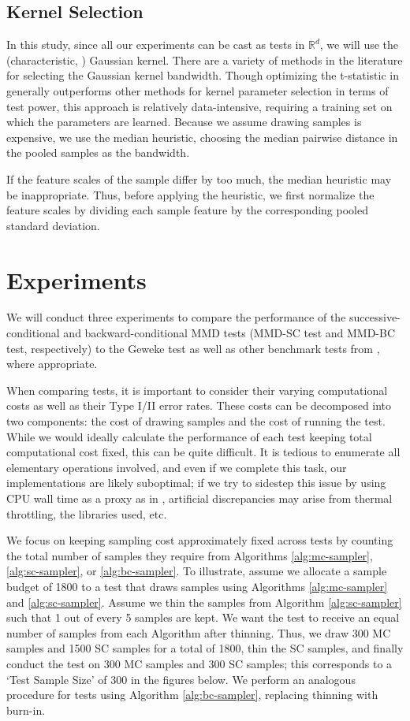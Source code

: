 \documentclass[a4paper,11pt]{article}
\begin{document}
\subsection{Kernel Selection}
In this study, since all our experiments can be cast as tests in $\mathbb{R}^{d}$, we will use the (characteristic, \cite{fukumizu_kernel_2007}) Gaussian kernel. There are a variety of methods in the literature for selecting the Gaussian kernel bandwidth. Though optimizing the t-statistic in \cite{sutherland_generative_2019} generally outperforms other methods for kernel parameter selection in terms of test power, this approach is relatively data-intensive, requiring a training set on which the parameters are learned. Because we assume drawing samples is expensive, we use the median heuristic, choosing the median pairwise distance in the pooled samples as the bandwidth.

If the feature scales of the sample differ by too much, the median heuristic may be inappropriate. Thus, before applying the heuristic, we first normalize the feature scales by dividing each sample feature by the corresponding pooled standard deviation.

\section{Experiments}
We will conduct three experiments to compare the performance of the successive-conditional and backward-conditional MMD tests (MMD-SC test and MMD-BC test, respectively) to the Geweke test as well as other benchmark tests from \cite{gandy_unit_2020}, where appropriate.

When comparing tests, it is important to consider their varying computational costs as well as their Type I/II error rates. These costs can be decomposed into two components: the cost of drawing samples and the cost of running the test. While we would ideally calculate the performance of each test keeping total computational cost fixed, this can be quite difficult. It is tedious to enumerate all elementary operations involved, and even if we complete this task, our implementations are likely suboptimal; if we try to sidestep this issue by using CPU wall time as a proxy as in \cite{gandy_unit_2020}, artificial discrepancies may arise from thermal throttling, the libraries used, etc. 

We focus on keeping sampling cost approximately fixed across tests by counting the total number of samples they require from Algorithms \ref{alg:mc-sampler}, \ref{alg:sc-sampler}, or \ref{alg:bc-sampler}. To illustrate, assume we allocate a sample budget of 1800 to a test that draws samples using Algorithms \ref{alg:mc-sampler} and \ref{alg:sc-sampler}. Assume we thin the samples from Algorithm \ref{alg:sc-sampler} such that 1 out of every 5 samples are kept. We want the test to receive an equal number of samples from each Algorithm after thinning. Thus, we draw 300 MC samples and 1500 SC samples for a total of 1800, thin the SC samples, and finally conduct the test on 300 MC samples and 300 SC samples; this corresponds to a `Test Sample Size' of 300 in the figures below. We perform an analogous procedure for tests using Algorithm \ref{alg:bc-sampler}, replacing thinning with burn-in.
\end{document}
